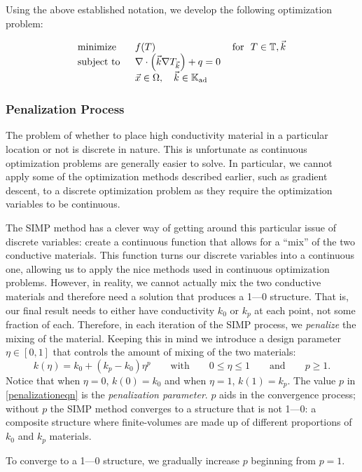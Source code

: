 Using the above established notation, we develop the following optimization problem:

{\color{baystate}
	\begin{equation}
		\begin{tabular}{lll}
			\text{minimize }   & $f(T)$ & \text{for } $T\in\mathbb{T},\vec{k}$      \\
			\text{subject to } & $\nabla\cdot\left(\vec{k}\nabla T_{\vec{k}}\right)+q=0$ & \\
			& $\vec{x}\in\Omega,\quad\vec{k}\in\mathbb{K}_{\text{ad}}$&      
		\end{tabular}\label{SIMP-Optimization-Problem}
	\end{equation}
}

\subsubsection*{Penalization Process}
The problem of whether to place high conductivity material in a particular location or not is discrete in nature. This is unfortunate as continuous optimization problems are generally easier to solve. In particular, we cannot apply some of the optimization methods described earlier, such as gradient descent, to a discrete optimization problem as they require the optimization variables to be continuous.

The SIMP method has a clever way of getting around this particular issue of discrete variables: create a continuous function that allows for a ``mix'' of the two conductive materials. This function turns our discrete variables into a continuous one, allowing us to apply the nice methods used in continuous optimization problems. However, in reality, we cannot actually mix the two conductive materials and therefore need a solution that produces a 1---0 structure. That is, our final result needs to either have conductivity $k_0$ or $k_p$ at each point, not some fraction of each. Therefore, in each iteration of the SIMP process, we \textit{penalize} the mixing of the material. Keeping this in mind we introduce a design parameter $\eta\in\left[0,1\right]$ that controls the amount of mixing of the two materials:
\begin{equation}
	k\left(\eta\right)=k_0+\left(k_p-k_0\right)\eta^p\qquad\text{with}\qquad 0\leq\eta\leq 1\qquad\text{and}\qquad p\geq1.\label{penalizationeqn}
\end{equation}
Notice that when $\eta=0$, $k\left(0\right)=k_0$ and when $\eta=1$, $k\left(1\right)=k_p$. The value $p$ in \eqref{penalizationeqn} is the \textit{penalization parameter}. $p$ aids in the convergence process; without $p$ the SIMP method converges to a structure that is not 1---0: a composite structure where finite-volumes are made up of different proportions of $k_0$ and $k_p$ materials.

To converge to a 1---0 structure, we gradually increase $p$ beginning from $p=1$.